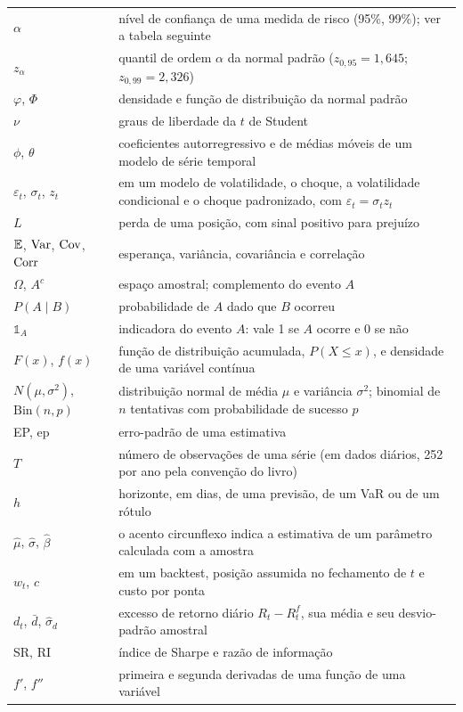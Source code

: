\begin{longtable}{>{\raggedright\arraybackslash}p{27mm} >{\raggedright\arraybackslash}p{82mm}}
$\alpha$ & nível de confiança de uma medida de risco (95\%, 99\%); ver a tabela seguinte \\
$z_\alpha$ & quantil de ordem $\alpha$ da normal padrão ($z_{0,95} = 1,645$; $z_{0,99} = 2,326$) \\
$\varphi$, $\Phi$ & densidade e função de distribuição da normal padrão \\
$\nu$ & graus de liberdade da $t$ de Student \\
$\phi$, $\theta$ & coeficientes autorregressivo e de médias móveis de um modelo de série temporal \\
$\varepsilon_t$, $\sigma_t$, $z_t$ & em um modelo de volatilidade, o choque, a volatilidade condicional e o choque padronizado, com $\varepsilon_t = \sigma_t z_t$ \\
$L$ & perda de uma posição, com sinal positivo para prejuízo \\
$\operatorname{\mathbb{E}}$, $\operatorname{Var}$, $\operatorname{Cov}$, $\operatorname{Corr}$ & esperança, variância, covariância e correlação \\
$\Omega$, $A^c$ & espaço amostral; complemento do evento $A$ \\
$P(A \mid B)$ & probabilidade de $A$ dado que $B$ ocorreu \\
$\mathbb{1}_A$ & indicadora do evento $A$: vale 1 se $A$ ocorre e 0 se não \\
$F(x)$, $f(x)$ & função de distribuição acumulada, $P(X \le x)$, e densidade de uma variável contínua \\
$N(\mu, \sigma^2)$, $\mathrm{Bin}(n, p)$ & distribuição normal de média $\mu$ e variância $\sigma^2$; binomial de $n$ tentativas com probabilidade de sucesso $p$ \\
EP, ep & erro-padrão de uma estimativa \\
$T$ & número de observações de uma série (em dados diários, 252 por ano pela convenção do livro) \\
$h$ & horizonte, em dias, de uma previsão, de um VaR ou de um rótulo \\
$\hat\mu$, $\hat\sigma$, $\hat\beta$ & o acento circunflexo indica a estimativa de um parâmetro calculada com a amostra \\
$w_t$, $c$ & em um backtest, posição assumida no fechamento de $t$ e custo por ponta \\
$d_t$, $\bar d$, $\hat\sigma_d$ & excesso de retorno diário $R_t - R^f_t$, sua média e seu desvio-padrão amostral \\
SR, RI & índice de Sharpe e razão de informação \\
$f'$, $f''$ & primeira e segunda derivadas de uma função de uma variável \\

\end{longtable}
